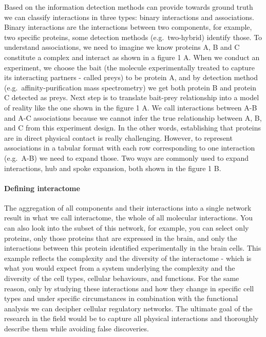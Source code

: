 \documentclass[]{article}
\let\oldparagraph\paragraph
\renewcommand{\paragraph}[1]{\oldparagraph{#1}\mbox{}}
\begin{document}
Based on the information detection methods can provide towards ground
truth we can classify interactions in three types: binary interactions
and associations. Binary interactions are the interactions between two
components, for example, two specific proteins, some detection methods
(e.g.~two-hybrid) identify those. To understand associations, we need to
imagine we know proteins A, B and C constitute a complex and interact as
shown in a figure 1 A. When we conduct an experiment, we choose the bait
(the molecule experimentally treated to capture its interacting partners
- called preys) to be protein A, and by detection method
(e.g.~affinity-purification mass spectrometry) we get both protein B and
protein C detected as preys. Next step is to translate bait-prey
relationship into a model of reality like the one shown in the figure 1
A. We call interactions between A-B and A-C associations because we
cannot infer the true relationship between A, B, and C from this
experiment design. In the other words, establishing that proteins are in
direct physical contact is really challenging. However, to represent
associations in a tabular format with each row corresponding to one
interaction (e.g.~A-B) we need to expand those. Two ways are commonly
used to expand interactions, hub and spoke expansion, both shown in the
figure 1 B.

\paragraph{Defining interactome}\label{defining-interactome}

The aggregation of all components and their interactions into a single
network result in what we call interactome, the whole of all molecular
interactions. You can also look into the subset of this network, for
example, you can select only proteins, only those proteins that are
expressed in the brain, and only the interactions between this protein
identified experimentally in the brain cells. This example reflects the
complexity and the diversity of the interactome - which is what you
would expect from a system underlying the complexity and the diversity
of the cell types, cellular behaviours, and functions. For the same
reason, only by studying these interactions and how they change in
specific cell types and under specific circumstances in combination with
the functional analysis we can decipher cellular regulatory networks.
The ultimate goal of the research in the field would be to capture all
physical interactions and thoroughly describe them while avoiding false
discoveries.
\end{document}
